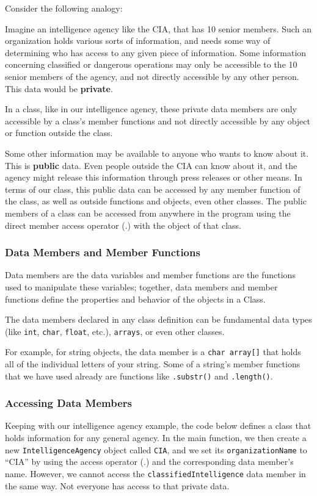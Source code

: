 Consider the following analogy:

Imagine an intelligence agency like the CIA, that has 10 senior members. Such an organization holds various sorts of information, and needs some way of determining who has access to any given piece of information. Some information concerning classified or dangerous operations may only be accessible to the 10 senior members of the agency, and not directly accessible by any other person. This data would be \textbf{private}.

In a class, like in our intelligence agency, these private data members are only accessible by a class's member functions and not directly accessible by any object or function outside the class.

Some other information may be available to anyone who wants to know about it. This is \textbf{public} data. Even people outside the CIA can know about it, and the agency might release this information through press releases or other means. In terms of our class, this public data can be accessed by any member function of the class, as well as outside functions and objects, even other classes. The public members of a class can be accessed from anywhere in the program using the direct member access operator (.) with the object of that class.

\subsubsection{Data Members and Member Functions}
Data members are the data variables and member functions are the functions used to manipulate these variables; together, data members and member functions define the properties and behavior of the objects in a Class.

The data members declared in any class definition can be fundamental data types (like \texttt{int}, \texttt{char}, \texttt{float}, etc.), \texttt{arrays}, or even other classes.

For example, for string objects, the data member is a \texttt{char array[]} that holds all of the individual letters of your string. Some of a string’s member functions that we have used already are functions like \texttt{.substr()} and \texttt{.length()}.

\subsubsection{Accessing Data Members}
Keeping with our intelligence agency example, the code below defines a class that holds information for any general agency. In the main function, we then create a new \texttt{IntelligenceAgency} object called \texttt{CIA}, and we set its \texttt{organizationName} to “CIA” by using the access operator (.) and the corresponding data member’s name. However, we cannot access the \texttt{classifiedIntelligence} data member in the same way. Not everyone has access to that private data.

